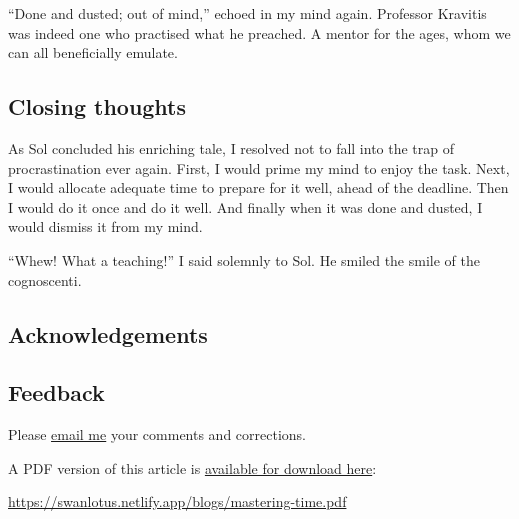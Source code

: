 \documentclass[
  a4paper,
]{article}
\begin{document}
``Done and dusted; out of mind,'' echoed in my mind again. Professor
Kravitis was indeed one who practised what he preached. A mentor for the
ages, whom we can all beneficially emulate.

\hypertarget{closing-thoughts}{%
\subsection{Closing thoughts}\label{closing-thoughts}}

As Sol concluded his enriching tale, I resolved not to fall into the
trap of procrastination ever again. First, I would prime my mind to
enjoy the task. Next, I would allocate adequate time to prepare for it
well, ahead of the deadline. Then I would do it once and do it well. And
finally when it was done and dusted, I would dismiss it from my mind.

``Whew! What a teaching!'' I said solemnly to Sol. He smiled the smile
of the cognoscenti.

\hypertarget{acknowledgements}{%
\subsection{Acknowledgements}\label{acknowledgements}}

\hypertarget{feedback}{%
\subsection{Feedback}\label{feedback}}

Please \href{mailto:feedback.swanlotus@gmail.com}{email me} your
comments and corrections.

\noindent A PDF version of this article is
\href{./mastering-time.pdf}{available for download here}:

\begin{small}

\begin{sffamily}

\url{https://swanlotus.netlify.app/blogs/mastering-time.pdf}

\end{sffamily}

\end{small}
\end{document}
